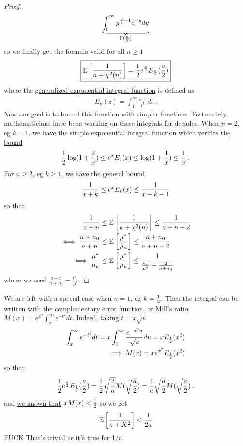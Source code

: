 \documentclass{article}
\newcommand*{\expect}[2][]{\ensuremath{\mathbb{E}_{#1} \left[ #2 \right] }} %
\newcommand{\MAPm}{\hat \mu_n}
\begin{document}
\begin{proof}
\begin{align}
		\underbrace{\int_0^\infty  y^{\frac{n}{2}-1} e^{-y} dy}_{\Gamma(\half[n])}
	\end{align}
	so we finally get  the formula valid for all $n\geq 1$
	\begin{align}
		\boxed{\expect{\inv{a + \chi^2(n)}}  = \half e^{\frac{a}{2}} E_{\half[n]}(\half[a])}
		\label{eq:hard_expectation}
	\end{align}
	where the \href{https://dlmf.nist.gov/8.19}{generalized exponential integral function} is defined as 
	\begin{align}
		E_k(z) = \int_1^\infty \frac{e^{-z t} }{t^k} dt \; .
	\end{align}
	Now our goal is to bound this function with simpler functions.
	Fortunately, mathematicians have been working on these integrals for decades.
	When $n=2$, eg $k=1$, we have the simple exponential integral function which \href{https://dlmf.nist.gov/6.8\#E1}{verifies the bound}
	\begin{align}
		\half \log(1 + \frac{2}{x}) 
		\leq e^x E_1(x) 
		\leq \log(1+\inv{x}) \leq \inv{x} \; .
	\end{align}
	For $n \geq 2$, eg $k\geq 1$, we have \href{https://dlmf.nist.gov/8.19\#E21}{the general bound}
	\begin{align}
		\inv{x+k}
		\leq e^x E_k(x) 
		\leq \inv{x + k - 1}
	\end{align}
	so that 
	\begin{align}
		\inv{a+n}
		&\leq \expect{\inv{a + \chi^2(n)}}
		\leq \inv{a + n - 2} \\
		\iff \frac{n +n_0}{a + n}	
		&\leq  \expect{\frac{\mu^*}{\MAPm}} 
		\leq \frac{n +n_0}{a + n - 2}	\\
		\iff \frac{\mu^*}{\mu_n}
		&\leq \expect{\frac{\mu^*}{\MAPm}} 
		\leq \frac{1}{\frac{\mu_n}{\mu^*} - \frac{2}{n + n_0}}  
	\end{align}
	where we used $\frac{a + n}{n +n_0} = \frac{\mu_n}{\mu^*}$.
\end{proof}

We are left with a special case when  $n=1$, eg $k=\half$. Then the integral can be written with the complementary error function, or \href{https://dlmf.nist.gov/7.8#E1}{Mill's ratio} $M(x) = e^{x^2} \int_x^\infty e^{-t^2} dt$. Indeed, taking $t= x \sqrt{u}$
\begin{align}
	\int_x^\infty e^{-t^2} dt = x \int_1^\infty \frac{e^{-x^2 u}}{\sqrt{u}} du = x E_{\half}(x^2) \\
	\implies M(x) = x e^{x^2} E_{\half}(x^2)
\end{align}
so that 
\begin{align}
		\half e^{\half[a]} E_{\half[1]}(\half[a]) 
		= \half \sqrt{\frac{2}{a}} M(\sqrt{\half[a]})
		= \inv{a} \sqrt{\half[a]} M(\sqrt{\half[a]}) \; .
\end{align}
and \href{https://dlmf.nist.gov/7.8#E5}{we known that} $x M(x) < \half$ so we get 
\begin{align}
	\expect{\inv{a + X^2}} < \inv{2 a}
\end{align}
FUCK That's  trivial as  it's true for 1/a.
\end{document}
